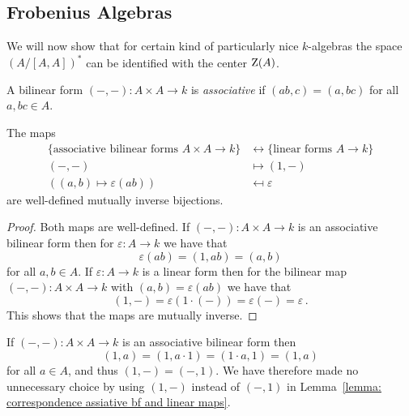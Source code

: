 \subsection{Frobenius Algebras}


\begin{fluff}
  We will now show that for certain kind of particularly nice $k$-algebras the space $(A/[A,A])^*$ can be identified with the center $\operatorname{Z}(A)$.
\end{fluff}


\begin{definition}
  A bilinear form $(-,-) \colon A \times A \to k$ is \emph{associative} if $(ab,c) = (a,bc)$ for all $a, b c \in A$.
\end{definition}


\begin{lemma}
  \label{lemma: correspondence assiative bf and linear maps}
  The maps
  \begin{align*}
    \{ \text{associative bilinear forms $A \times A \to k$} \}
    &\longleftrightarrow
    \{ \text{linear forms $A \to k$} \}
    \\
    (-,-)
    &\longmapsto
    (1,-)
    \\
    ((a,b) \mapsto \varepsilon(ab))
    &\mapsfrom
    \varepsilon
  \end{align*}
  are well-defined mutually inverse bijections.
\end{lemma}


\begin{proof}
  Both maps are well-defined.
  If $(-,-) \colon A \times A \to k$ is an associative bilinear form then for $\varepsilon \colon A \to k$ we have that
  \[
      \varepsilon(ab)
    = (1,ab)
    = (a,b)
  \]
  for all $a, b \in A$.
  If $\varepsilon \colon A \to k$ is a linear form then for the bilinear map $(-,-) \colon A \times A \to k$ with $(a,b) = \varepsilon(ab)$ we have that
  \[
      (1,-)
    = \varepsilon(1 \cdot (-))
    = \varepsilon(-)
    = \varepsilon \,.
  \]
  This shows that the maps are mutually inverse.
\end{proof}


\begin{remark}
  If $(-,-) \colon A \times A \to k$ is an associative bilinear form then
  \[
      (1,a)
    = (1, a \cdot 1)
    = (1 \cdot a, 1)
    = (1, a)
  \]
  for all $a \in A$, and thus $(1,-) = (-,1)$.
  We have therefore made no unnecessary choice by using $(1,-)$ instead of $(-,1)$ in Lemma~\ref{lemma: correspondence assiative bf and linear maps}.
\end{remark}


